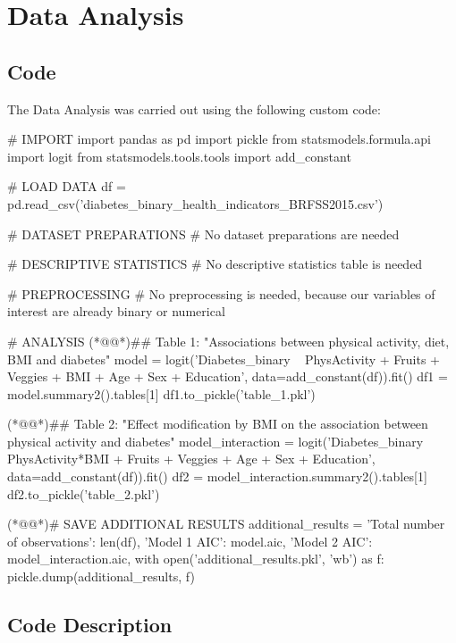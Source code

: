 \documentclass[11pt]{article}
\begin{document}
\section{Data Analysis}
\subsection{{Code}}
The Data Analysis was carried out using the following custom code:

\begin{python}

# IMPORT
import pandas as pd
import pickle
from statsmodels.formula.api import logit
from statsmodels.tools.tools import add_constant

# LOAD DATA
df = pd.read_csv('diabetes_binary_health_indicators_BRFSS2015.csv')

# DATASET PREPARATIONS
# No dataset preparations are needed

# DESCRIPTIVE STATISTICS
# No descriptive statistics table is needed

# PREPROCESSING
# No preprocessing is needed, because our variables of interest are already binary or numerical

# ANALYSIS
(*@@*)## Table 1: "Associations between physical activity, diet, BMI and diabetes"
model = logit('Diabetes_binary ~ PhysActivity + Fruits + Veggies + BMI + Age + Sex + Education',
    data=add_constant(df)).fit()
df1 = model.summary2().tables[1]
df1.to_pickle('table_1.pkl')

(*@@*)## Table 2: "Effect modification by BMI on the association between physical activity and diabetes"
model_interaction = logit('Diabetes_binary ~ PhysActivity*BMI + Fruits + Veggies + Age + Sex + Education',
    data=add_constant(df)).fit()
df2 = model_interaction.summary2().tables[1]
df2.to_pickle('table_2.pkl')

(*@@*)# SAVE ADDITIONAL RESULTS
additional_results = {
    'Total number of observations': len(df),
    'Model 1 AIC': model.aic,
    'Model 2 AIC': model_interaction.aic,
}
with open('additional_results.pkl', 'wb') as f:
    pickle.dump(additional_results, f)

\end{python}

\subsection{Code Description}
\end{document}

